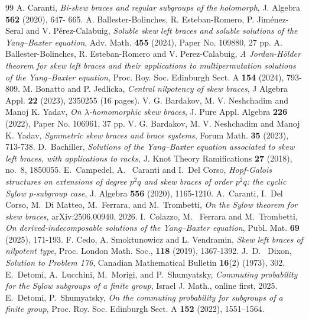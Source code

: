 \documentclass[10pt,a4paper]{amsart}
\numberwithin{equation}{section}
\begin{document}
\begin{thebibliography}{99}
 A. Caranti, \emph{Bi-skew braces and regular subgroups of the holomorph}, J. Algebra {\bf 562} (2020), 647- 665.
 A. Ballester-Bolinches, R. Esteban-Romero, P. Jiménez-Seral and V. Pérez-Calabuig, \emph{Soluble skew left braces and soluble solutions of the Yang--Baxter equation}, Adv. Math. {\bf 455} (2024), Paper No. 109880, 27 pp.
 A. Ballester-Bolinches, R. Esteban-Romero and V. Perez-Calabuig, \emph{A Jordan-Hölder theorem for skew left braces and their applications to multipermutation solutions of the Yang--Baxter equation}, Proc. Roy. Soc. Edinburgh Sect. A {\bf 154} (2024), 793-809.
 M. Bonatto and P. Jedlicka, \emph{Central nilpotency of skew braces}, J Algebra Appl. {\bf 22} (2023), 2350255 (16 pages).
 V. G. Bardakov, M. V. Neshchadim and Manoj K. Yadav, \emph{On $\lambda$-homomorphic skew braces}, J. Pure Appl. Algebra {\bf 226} (2022), Paper No. 106961, 37 pp.
 V. G. Bardakov, M. V. Neshchadim and Manoj K. Yadav, \emph{Symmetric skew braces and brace systems}, Forum Math. {\bf 35} (2023), 713-738.
 D.~Bachiller, \emph{Solutions of the Yang--Baxter equation associated to skew left braces, with applications to racks}, J. Knot Theory Ramifications \textbf{27} (2018), no.~8, 1850055.
 E.~Campedel, A.~ Caranti and I.~Del Corso, \emph{Hopf-Galois structures on extensions of degree $p^2q$ and skew braces of order $p^2q$: the cyclic Sylow p-subgroup case}, J. Algebra {\bf 556} (2020), 1165-1210.
 A.~Caranti, I.~Del Corso, M.~Di Matteo, M.~Ferrara, and M.~Trombetti, \emph{On the Sylow theorem for skew braces}, arXiv:2506.00940, 2026.
 I.~Colazzo, M.~ Ferrara and M.~Trombetti, \emph{On derived-indecomposable solutions of the Yang--Baxter equation}, Publ. Mat. {\bf 69} (2025), 171-193.
 F. Cedo, A. Smoktunowicz and L. Vendramin, {\it Skew left braces of nilpotent type}, Proc. London Math. Soc., {\bf 118} (2019), 1367-1392.
 J.~D.~ Dixon, \emph{Solution to Problem 176}, Canadian Mathematical Bulletin {\bf 16}(2) (1973), 302.
 E.~Detomi, A.~Lucchini, M.~Morigi, and P.~Shumyatsky, \emph{Commuting probability for the Sylow subgroups of a finite group}, Israel J. Math., online first, 2025.
 E.~Detomi, P.~Shumyatsky, \emph{On the commuting probability for subgroups of a finite group}, Proc. Roy. Soc. Edinburgh Sect. A {\bf 152} (2022), 1551--1564.

\end{thebibliography}
\end{document}
